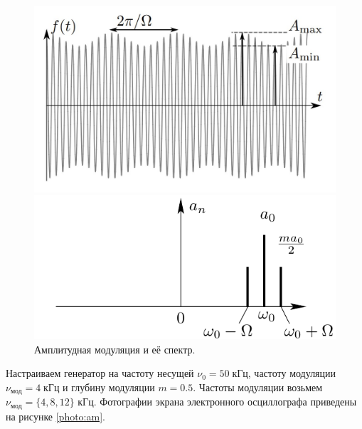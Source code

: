 \begin{figure}[H]
	\centering
	\begin{minipage}[b]{.49\textwidth}
		\centering
		\includegraphics[width=0.9\linewidth]{"../res/am"}
	\end{minipage}%
	\begin{minipage}[b]{.49\textwidth}
		\centering
		\includegraphics[width=1.0\linewidth]{"../res/am_spectrum"}
	\end{minipage}
	\caption{Амплитудная модуляция и её спектр.}
	\label{res:am}
\end{figure}

Настраиваем генератор на частоту несущей $\nu_{0} = 50 \; \text{кГц}$, частоту модуляции
$\nu_{\text{мод}} = 4 \; \text{кГц}$ и глубину модуляции $m = 0.5$. Частоты модуляции возьмем $\nu_{\text{мод}} = \{4, 8, 12\}$ кГц. Фотографии экрана электронного осциллографа приведены на рисунке \ref{photo:am}.	

